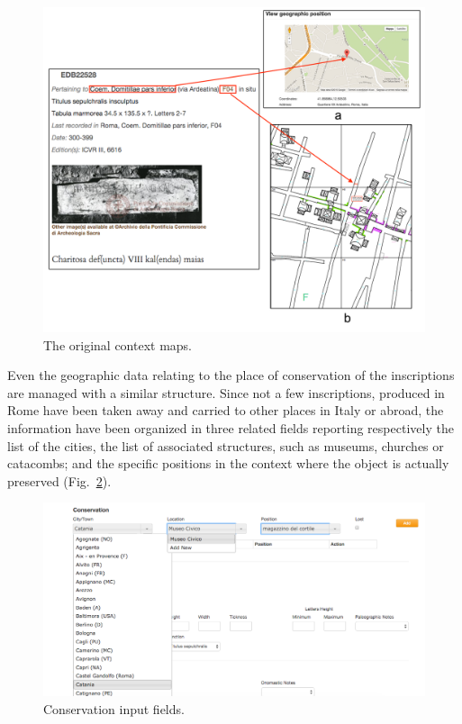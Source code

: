 \documentclass[amsthm,ebook]{saparticle}
\begin{document}
 \begin{figure}[!hbp]
\centering
 \includegraphics[width=\columnwidth]{EAGLE2016Roccoengrev-img006.png} 
\caption{The original context maps.}
\label{fig:6}
\end{figure}


Even the geographic data relating to the place of conservation of the inscriptions are managed with a similar structure.
Since not a few inscriptions, produced in Rome have been taken away and carried to other places in Italy or abroad, the
information have been organized in three related fields reporting respectively the list of the cities, the list of
associated structures, such as museums, churches or catacombs; and the specific positions in the context where the
object is actually preserved (Fig.~\ref{fig:7}).




\begin{figure}[hbp]
\centering
 \includegraphics[width=\columnwidth]{Fig7.png}
\caption{Conservation input fields.}
\label{fig:7}
\end{figure}
\end{document}
